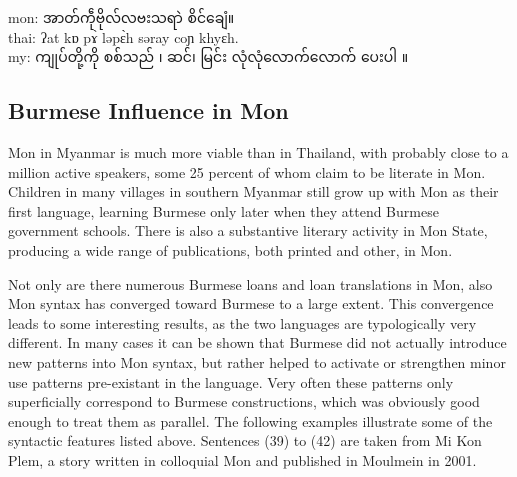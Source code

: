\documentclass[conference]{IEEEtran}
\begin{document}
\noindent mon: {\padauktext အာတ်ကဵုဗိုလ်လဗးသရာဲ စိင်ချေံ။}\\
thai:  ʔat kɒ pɤ̀ ləpɛ̀h səray coɲ khyɛh.\\
my: {\padauktext ကျုပ်တို့ကို စစ်သည် ၊ ဆင်၊ မြင်း လုံလုံလောက်လောက် ပေးပါ ။}\\

\subsection{Burmese Influence in Mon}
Mon in Myanmar is much more viable than in Thailand, with probably close to a million active speakers, some 25 percent of whom claim to be literate in Mon. Children in many villages in southern Myanmar still grow up with Mon as their first language, learning Burmese only later when they attend Burmese government schools. There is also a substantive literary activity in Mon State, producing a wide range of publications, both printed and other, in Mon.
\par Not only are there numerous Burmese loans and loan translations in Mon, also Mon syntax has converged toward Burmese to a large extent. This convergence leads to some interesting results, as the two languages are typologically very different. In many cases it can be shown that Burmese did not actually introduce new patterns into Mon syntax, but rather helped to activate or strengthen minor use patterns pre-existant in the language. Very often these patterns only superficially correspond to Burmese constructions, which was obviously good enough to treat them as parallel. The following examples illustrate some of the syntactic features listed above.
Sentences (39) to (42) are taken from Mi Kon Plem, a story written in colloquial Mon and published in Moulmein in 2001.
\end{document}
